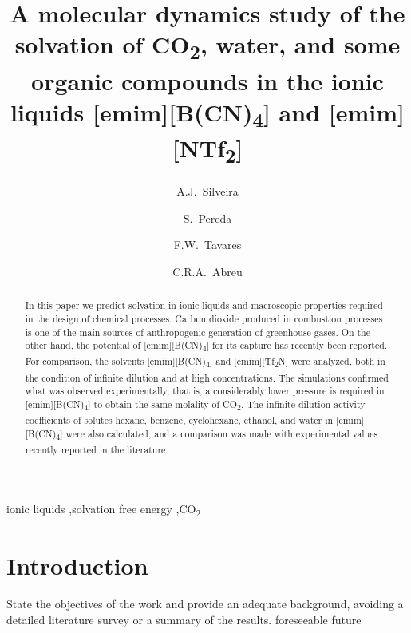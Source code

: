 \documentclass[3p,twocolumn]{elsarticle}
\begin{document}
\begin{frontmatter}

\title{A molecular dynamics study of the solvation of CO\textsubscript{2}, water, and some organic compounds in the ionic liquids [emim][B(CN)\textsubscript{4}] and [emim][NTf\textsubscript{2}]}

\author[rvt]{A.J.~Silveira}
\author[rvt]{S.~Pereda}
\author[focal,els]{F.W.~Tavares}
\author[focal]{C.R.A.~Abreu}

\address[rvt]{Planta Piloto de Ingenier\'ia Qu\'imica, PLAPIQUI, Universidad Nacional del Sur,Camino La Carrindanga Km 7-CC: 717, Bah\'ia Blanca, Argentina}
\address[focal]{Chemical Engineering Department, Escola de Qu\'imica, Universidade Federal do Rio de Janeiro,Rio de Janeiro, RJ 21941-909, Brazil}
\address[els]{COPPE, Universidade Federal do Rio de Janeiro, Rio de Janeiro, RJ 21941-909, Brazil}


\begin{abstract}
In this paper we predict solvation in ionic liquids and macroscopic properties required in the design of chemical processes. Carbon dioxide produced in combustion processes is one of the main sources of anthropogenic generation of greenhouse gases. On the other hand, the potential of [emim][B(CN)\textsubscript{4}] for its capture has recently been reported. For comparison, the solvents [emim][B(CN)\textsubscript{4}] and [emim][Tf\textsubscript{2}N] were analyzed, both in the condition of infinite dilution and at high concentrations. The simulations confirmed what was observed experimentally, that is, a considerably lower pressure is required in [emim][B(CN)\textsubscript{4}] to obtain the same molality of CO\textsubscript{2}. The infinite-dilution activity coefficients of solutes hexane, benzene, cyclohexane, ethanol, and water in [emim][B(CN)\textsubscript{4}] were also calculated, and a comparison was made with experimental values recently reported in the literature.
\end{abstract}

\begin{keyword}
ionic liquids \sep solvation free energy \sep  CO\textsubscript{2} 
\end{keyword}

\end{frontmatter}

\linenumbers

\section{Introduction}
State the objectives of the work and provide an adequate background, avoiding a detailed literature survey or a summary of the results. foreseeable future 
\end{document}
